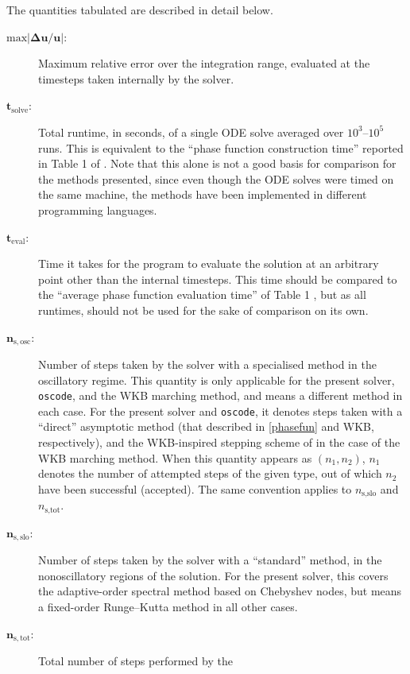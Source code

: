 \documentclass[10pt]{article}
\begin{document}
The quantities tabulated are described in detail below.
\begin{description}
    \item[$\bm{\mathrm{max}|\Delta u/u|}$:]{Maximum relative error over the
        integration range, evaluated at the timesteps taken internally by the
        solver.}
    \item[$\bm{t_{\mathrm{solve}}}$:]{Total runtime, in seconds, of a single
        ODE solve averaged over $10^3$--$10^5$ runs. This is equivalent to the
        ``phase function construction time'' reported in Table 1 of
        \cite{bremer2018}. Note that this alone is not a good basis for
        comparison for the methods presented, since even though the ODE solves
        were timed on the same machine, the methods have been implemented in
        different programming languages.}
    \item[$\bm{t_{\mathrm{eval}}}$:]{Time it takes for the program to evaluate
        the solution at an arbitrary point other than the internal timesteps.
        This time should be compared to the ``average phase function evaluation
        time'' of Table 1 \cite{bremer2018}, but as all runtimes, should not be
        used for the sake of comparison on its own.}
    \item[$\bm{n_{\mathrm{s,osc}}}$:]{Number of steps taken by the solver with
        a specialised method in the oscillatory regime. This quantity is only
        applicable for the present solver, \texttt{oscode}, and the WKB
        marching method, and means a different  method in each case. For the
        present solver and \texttt{oscode}, it denotes steps taken with a
        ``direct'' asymptotic method (that described in \cref{phasefun} and WKB,
        respectively), and the WKB-inspired stepping scheme of
        \cite{korner2022wkb} in the case of the WKB marching method. When this
        quantity appears as $(n_1, n_2)$, $n_1$ denotes the number of attempted
        steps of the given type, out of which $n_2$ have been successful
        (accepted). The same convention applies to $n_{\text{s,slo}}$ and
        $n_{\text{s,tot}}$.}
    \item[$\bm{n_{\mathrm{s,slo}}}$:]{Number of steps taken by the solver with
        a ``standard'' method, in the nonoscillatory regions of the solution.
        For the present solver, this covers the adaptive-order spectral method
        based on Chebyshev nodes, but means a fixed-order Runge--Kutta method
        in all other cases.}
    \item[$\bm{n_{\mathrm{s,tot}}}$:]{Total number of steps performed by the
}
\end{description}
\end{document}
